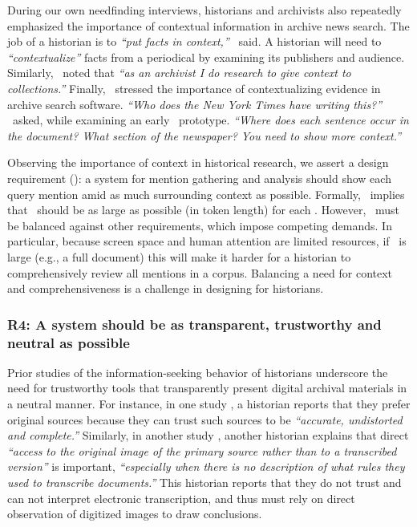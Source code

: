 During our own needfinding interviews, historians and archivists also repeatedly emphasized the importance of contextual information in archive news search.
The job of a historian is to \textit{``put facts in context,''}  \ifive~said. A historian will need to \textit{``contextualize''} facts from a periodical by examining its publishers and audience. Similarly, \ifour~noted that \textit{``as an archivist I do research to give context to collections.''}
Finally, \itwo~stressed the importance of contextualizing evidence in archive search software. \textit{``Who does the New York Times have writing this?''} \itwo~asked, while examining an early \ours~prototype. \textit{``Where does each sentence occur in the document? What section of the newspaper? You need to show more context.''}

Observing the importance of context in historical research, we assert a design requirement (\rcontext): a system for mention gathering and analysis should show each query mention amid as much surrounding context as possible.
Formally, \rcontext~implies that \mentionincontext~should be as large as possible (in token length) for each \specificmention.
However, \rcontext~must be balanced against other requirements, which impose competing demands. In particular, because screen space and human attention are limited resources, if \mentionincontext~is large (e.g., a full document) this will make it harder for a historian to comprehensively review all mentions in a corpus. Balancing a need for context and comprehensiveness is a challenge in designing for historians.


\subsubsection{\textbf{R4: A system should be as transparent, trustworthy and neutral as possible}}\label{s:needs_trust}

Prior studies of the information-seeking behavior of historians underscore the need for trustworthy tools that transparently present digital archival materials in a neutral manner. 
For instance, in one study \cite{DuffCraigCherry}, a historian reports that they prefer original sources because they can trust such sources to be \textit{``accurate, undistorted and complete.''} 
Similarly, in another study \cite{Chassanoff}, another historian explains that direct \textit{``access to the original image of the primary source rather than to a transcribed version''} is important, \textit{``especially when there is no description of what rules they used to transcribe documents.''}  
This historian reports that they do not trust and can not interpret electronic transcription, and thus must rely on direct observation of digitized images to draw conclusions.

